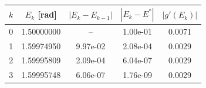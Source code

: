 \begin{tabular}{r c c c c}
\toprule
$k$ & $E_k$ [rad] & $|E_k-E_{k-1}|$ & $|E_k-E^*|$ & $|g'(E_k)|$\\
\midrule
0 & 1.50000000 & -- & 1.00e-01 & 0.0071\\
1 & 1.59974950 & 9.97e-02 & 2.08e-04 & 0.0029\\
2 & 1.59995809 & 2.09e-04 & 6.04e-07 & 0.0029\\
3 & 1.59995748 & 6.06e-07 & 1.76e-09 & 0.0029\\
\bottomrule
\end{tabular}
